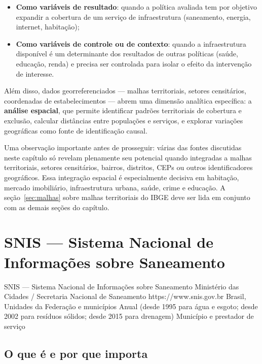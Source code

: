 \begin{itemize}
  \item \textbf{Como variáveis de resultado}: quando a política avaliada tem por objetivo expandir a cobertura de um serviço de infraestrutura (saneamento, energia, internet, habitação);
  \item \textbf{Como variáveis de controle ou de contexto}: quando a infraestrutura disponível é um determinante dos resultados de outras políticas (saúde, educação, renda) e precisa ser controlada para isolar o efeito da intervenção de interesse.
\end{itemize}

Além disso, dados georreferenciados --- malhas territoriais, setores censitários, coordenadas de estabelecimentos --- abrem uma dimensão analítica específica: a \textbf{análise espacial}, que permite identificar padrões territoriais de cobertura e exclusão, calcular distâncias entre populações e serviços, e explorar variações geográficas como fonte de identificação causal.

Uma observação importante antes de prosseguir: várias das fontes discutidas neste capítulo só revelam plenamente seu potencial quando integradas a malhas territoriais, setores censitários, bairros, distritos, CEPs ou outros identificadores geográficos. Essa integração espacial é especialmente decisiva em habitação, mercado imobiliário, infraestrutura urbana, saúde, crime e educação. A seção~\ref{sec:malhas} sobre malhas territoriais do IBGE deve ser lida em conjunto com as demais seções do capítulo.

\section{SNIS --- Sistema Nacional de Informações sobre Saneamento}

\ficharapida
  {SNIS --- Sistema Nacional de Informações sobre Saneamento}
  {Ministério das Cidades / Secretaria Nacional de Saneamento}
  {https://www.snis.gov.br}
  {Brasil, Unidades da Federação e municípios}
  {Anual (desde 1995 para água e esgoto; desde 2002 para resíduos sólidos; desde 2015 para drenagem)}
  {Município e prestador de serviço}

\subsection{O que é e por que importa}


